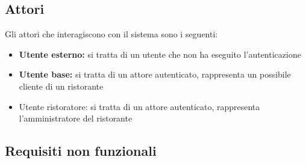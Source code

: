 \subsection{Attori}
Gli attori che interagiscono con il sistema sono i seguenti:
\begin{itemize}
    \item \textbf{Utente esterno:} si tratta di un utente che non ha eseguito l'autenticazione
    \item \textbf{Utente base:} si tratta di un attore autenticato, rappresenta un possibile cliente di un ristorante
    \item {Utente ristoratore:} si tratta di un attore autenticato, rappresenta l'amministratore del ristorante
\end{itemize}



\subsection{Requisiti non funzionali}

